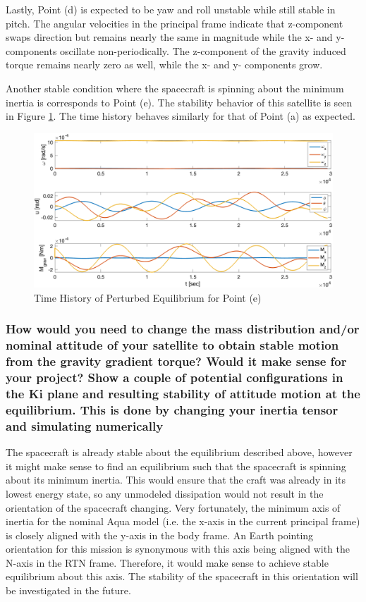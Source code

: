 Lastly, Point (d) is expected to be yaw and roll unstable while still stable in pitch. The angular velocities in the principal frame indicate that z-component swaps direction but remains nearly the same in magnitude while the x- and y-components oscillate non-periodically. The z-component of the gravity induced torque remains nearly zero as well, while the x- and y- components grow.

Another stable condition where the spacecraft is spinning about the minimum inertia is corresponds to Point (e). The stability behavior of this satellite is seen in Figure \ref{fig:point_e_grav_stability}. The time history behaves similarly for that of Point (a) as expected.

\begin{figure}[H]
    \centering
    \captionsetup{justification = centering}
    \includegraphics[width = 12cm]{Images/PS5/point_e_grav_stability.png}
    \caption{Time History of Perturbed Equilibrium for Point (e)}
    \label{fig:point_e_grav_stability}
\end{figure}

\subsubsection{How would you need to change the mass distribution and/or nominal attitude of your satellite to obtain stable motion from the gravity gradient torque? Would it make sense for your project? Show a couple of potential configurations in the Ki plane and resulting stability of attitude motion at the equilibrium. This is done by changing your inertia tensor and simulating numerically}

The spacecraft is already stable about the equilibrium described above, however it might make sense to find an equilibrium such that the spacecraft is spinning about its minimum inertia. This would ensure that the craft was already in its lowest energy state, so any unmodeled dissipation would not result in the orientation of the spacecraft changing. Very fortunately, the minimum axis of inertia for the nominal Aqua model (i.e. the x-axis in the current principal frame) is closely aligned with the y-axis in the body frame. An Earth pointing orientation for this mission is synonymous with this axis being aligned with the N-axis in the RTN frame. Therefore, it would make sense to achieve stable equilibrium about this axis. The stability of the spacecraft in this orientation will be investigated in the future.

